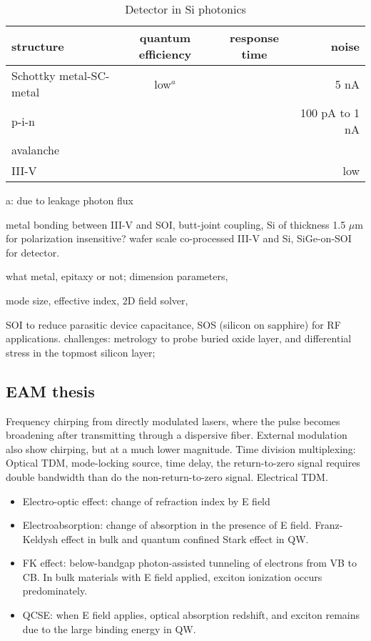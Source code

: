 \begin{table}[htb]
\centering
\caption{Detector in Si photonics}
\begin{tabular}{lccr}
\toprule
structure & quantum efficiency &  response time & noise   \\
\midrule
Schottky metal-SC-metal &   low$^a$     &           &  5 nA  \\
p-i-n                   &    &    & 100 pA to 1 nA  \\
avalanche               &    &    &    \\
III-V              &    &    &  low   \\
\bottomrule
\end{tabular}
a: due to leakage photon flux 

\end{table}

metal bonding between III-V and SOI, butt-joint coupling, Si of thickness 1.5 $\mu$m for polarization insensitive? wafer scale co-processed III-V and Si, SiGe-on-SOI for detector.

what metal, epitaxy or not; dimension parameters, 

mode size, effective index, 2D field solver, 

SOI to reduce parasitic device capacitance, SOS (silicon on sapphire) for RF applications. challenges: metrology to probe buried oxide layer, and differential stress in the topmost silicon layer; 

\subsection{EAM thesis}

Frequency chirping from directly modulated lasers, where the pulse becomes broadening after transmitting through a dispersive fiber. External modulation also show chirping, but at a much lower magnitude. Time division multiplexing: Optical TDM, mode-locking source, time delay, the return-to-zero signal requires double bandwidth than do the non-return-to-zero signal. Electrical TDM. 

\begin{itemize}
\item Electro-optic effect: change of refraction index by E field
\item Electroabsorption: change of absorption in the presence of E field. Franz-Keldysh effect in bulk and quantum confined Stark effect in QW. 
\item FK effect: below-bandgap photon-assisted tunneling of electrons from VB to CB. In bulk materials with E field applied, exciton ionization occurs predominately.
\item QCSE: when E field applies, optical absorption redshift, and exciton remains due to the large binding energy in QW. 
\end{itemize}

